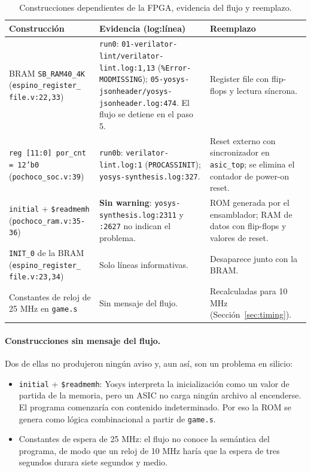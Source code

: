 \documentclass[11pt,letterpaper]{article}
\newcommand{\code}[1]{\texttt{#1}}
\newcommand{\fuente}{\par\vspace{3pt}{\footnotesize\emph{Fuente: Elaboración propia.}}\par}
\begin{document}
\begin{table}[H]
\centering
\caption{Construcciones dependientes de la FPGA, evidencia del flujo y reemplazo.}
\label{tab:fpga}
\footnotesize
\setlength{\emergencystretch}{3em}
\begin{tabularx}{\linewidth}{>{\raggedright\arraybackslash}p{3.0cm}>{\raggedright\arraybackslash}X>{\raggedright\arraybackslash}p{3.6cm}}
\toprule
\textbf{Construcción} & \textbf{Evidencia (log:línea)} & \textbf{Reemplazo}\\
\midrule
BRAM \code{SB\_RAM40\_4K} (\code{espino\_register\_ file.v:22,33}) &
\code{run0}: \code{01-verilator-lint/\allowbreak verilator-lint.log:1,13} (\code{\%Error-MODMISSING}); \code{05-yosys-jsonheader/\allowbreak yosys-jsonheader.log:474}. El flujo se detiene en el paso 5. &
Register file con flip-flops y lectura síncrona.\\
\addlinespace
\code{reg [11:0] por\_cnt = 12'b0} (\code{pochoco\_soc.v:39}) &
\code{run0b}: \code{verilator-lint.log:1} (\code{PROCASSINIT}); \code{yosys-synthesis.log:327}. &
Reset externo con sincronizador en \code{asic\_top}; se elimina el contador de power-on reset.\\
\addlinespace
\code{initial} + \code{\$readmemh} (\code{pochoco\_ram.v:35-36}) &
\textbf{Sin warning}: \code{yosys-synthesis.log:2311} y \code{:2627} no indican el problema. &
ROM generada por el ensamblador; RAM de datos con flip-flops y valores de reset.\\
\addlinespace
\code{INIT\_0} de la BRAM (\code{espino\_register\_ file.v:23,34}) &
Solo líneas informativas. &
Desaparece junto con la BRAM.\\
\addlinespace
Constantes de reloj de 25 MHz en \code{game.s} &
Sin mensaje del flujo. &
Recalculadas para 10 MHz (Sección~\ref{sec:timing}).\\
\bottomrule
\end{tabularx}
\fuente
\end{table}

\paragraph{Construcciones sin mensaje del flujo.} Dos de ellas no produjeron ningún aviso y, aun así, son un problema en silicio:
\begin{itemize}
  \item \code{initial} + \code{\$readmemh}: Yosys interpreta la inicialización como un valor de partida de la memoria, pero un ASIC no carga ningún archivo al encenderse. El programa comenzaría con contenido indeterminado. Por eso la ROM se genera como lógica combinacional a partir de \code{game.s}.
  \item Constantes de espera de 25 MHz: el flujo no conoce la semántica del programa, de modo que un reloj de 10 MHz haría que la espera de tres segundos durara siete segundos y medio.
\end{itemize}
\end{document}
